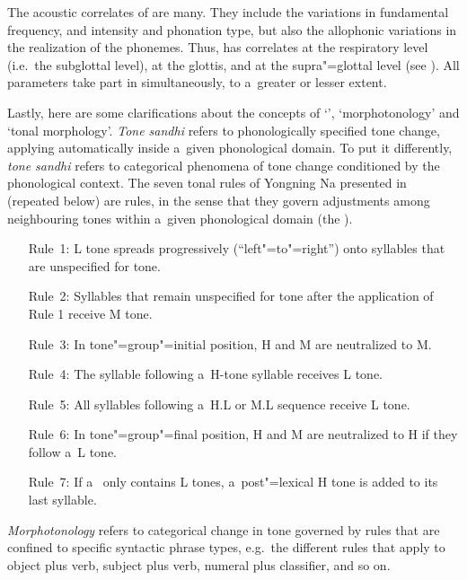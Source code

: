 The acoustic correlates of  are many. They include the variations in fundamental frequency,
 and intensity and phonation type, but also the allophonic variations in the realization of
the phonemes. Thus,  has correlates at the respiratory level (i.e.\ the subglottal level), at the glottis,
and at the supra"=glottal level (see \citealt{erickson1998}). All parameters take part in  simultaneously, to a~greater or
lesser extent.

Lastly, here are some clarifications about the concepts of ‘’, ‘morphotonology’ and ‘tonal morphology’. \textit{Tone sandhi} refers to phonologically specified tone change, applying automatically inside a~given phonological domain. To put it differently, \textit{tone sandhi} refers to categorical phenomena of tone change conditioned by the phonological context. The seven tonal rules of Yongning Na presented in  (repeated below) are  rules, in the sense that they govern adjustments among neighbouring tones within a~given phonological domain (the ).

	\begin{enumerate}[leftmargin=2cm, itemsep=0pt, labelwidth=\widthof{Rule~1:}]%
		\item[Rule~1:] L tone spreads progressively (“left"=to"=right”) onto syllables that are unspecified for tone.
		\item[Rule~2:] Syllables that remain unspecified for tone after the application of Rule 1 receive M tone.
		\item[Rule~3:] In tone"=group"=initial position, H and M are neutralized to M.
		\item[Rule~4:] The syllable following a~H-tone syllable receives L tone.
		\item[Rule~5:] All syllables following a~H.L or M.L sequence receive L tone.
		\item[Rule~6:] In tone"=group"=final position, H and M are neutralized to H if they follow a~L tone.
		\item[Rule~7:] If a~ only contains L tones, a~post"=lexical H tone is added to its last syllable.
	\end{enumerate}

\textit{Morphotonology} refers to categorical change in tone governed by rules that are confined to specific syntactic phrase types, e.g.~the different rules that apply to object plus verb, subject plus verb, numeral plus classifier, and so on. 

